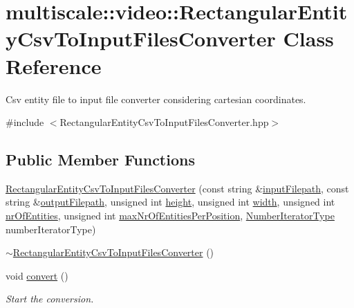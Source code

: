 \hypertarget{classmultiscale_1_1video_1_1RectangularEntityCsvToInputFilesConverter}{\section{multiscale\-:\-:video\-:\-:\-Rectangular\-Entity\-Csv\-To\-Input\-Files\-Converter \-Class \-Reference}
\label{classmultiscale_1_1video_1_1RectangularEntityCsvToInputFilesConverter}
}


\-Csv entity file to input file converter considering cartesian coordinates.  




{\ttfamily \#include $<$\-Rectangular\-Entity\-Csv\-To\-Input\-Files\-Converter.\-hpp$>$}

\subsection*{\-Public \-Member \-Functions}
\begin{DoxyCompactItemize}
\item 
\hyperlink{classmultiscale_1_1video_1_1RectangularEntityCsvToInputFilesConverter_aad6061faff7cfbe5c005faf460d77951}{\-Rectangular\-Entity\-Csv\-To\-Input\-Files\-Converter} (const string \&\hyperlink{classmultiscale_1_1video_1_1RectangularEntityCsvToInputFilesConverter_adde5ccc0bde141f73917eba8029fe1f6}{input\-Filepath}, const string \&\hyperlink{classmultiscale_1_1video_1_1RectangularEntityCsvToInputFilesConverter_a84ea5fc8e195a17eb929812f962cb851}{output\-Filepath}, unsigned int \hyperlink{classmultiscale_1_1video_1_1RectangularEntityCsvToInputFilesConverter_a68cb5dba20157ea4977c1069626cb0ab}{height}, unsigned int \hyperlink{classmultiscale_1_1video_1_1RectangularEntityCsvToInputFilesConverter_ac4542ad4008e85ab4860146eed6e0200}{width}, unsigned int \hyperlink{classmultiscale_1_1video_1_1RectangularEntityCsvToInputFilesConverter_aebbddb80b0b0e44e4ea8e111994a2f5d}{nr\-Of\-Entities}, unsigned int \hyperlink{classmultiscale_1_1video_1_1RectangularEntityCsvToInputFilesConverter_adcea224ee3e6f8fbecca3754774afbac}{max\-Nr\-Of\-Entities\-Per\-Position}, \hyperlink{namespacemultiscale_a6ef911f4d48a4bf5e657c237ec169ff5}{\-Number\-Iterator\-Type} number\-Iterator\-Type)
\item 
\hyperlink{classmultiscale_1_1video_1_1RectangularEntityCsvToInputFilesConverter_af3085f7d4f6836c0d5edf19f4a59bac7}{$\sim$\-Rectangular\-Entity\-Csv\-To\-Input\-Files\-Converter} ()
\item 
void \hyperlink{classmultiscale_1_1video_1_1RectangularEntityCsvToInputFilesConverter_a7cf56e73e5b1c627bab05d4be3cdb405}{convert} ()
\begin{DoxyCompactList}\small\item\em \-Start the conversion. \end{DoxyCompactList}\end{DoxyCompactItemize}
